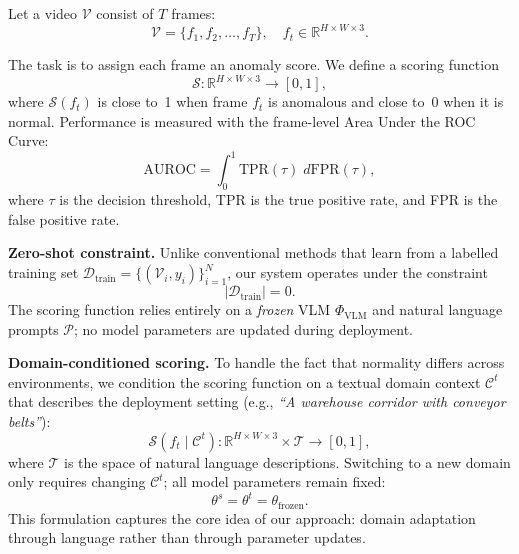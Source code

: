 Let a video $\mathcal{V}$ consist of $T$ frames:
\begin{equation}
    \mathcal{V} = \{f_1, f_2, \ldots, f_T\}, \quad f_t \in \mathbb{R}^{H \times W \times 3}.
\end{equation}

\noindent The task is to assign each frame an anomaly score. We define a scoring function
\begin{equation}
    \mathcal{S} : \mathbb{R}^{H \times W \times 3} \rightarrow [0, 1],
\end{equation}
where $\mathcal{S}(f_t)$ is close to~1 when frame $f_t$ is anomalous and close to~0 when it is normal. Performance is measured with the frame-level Area Under the ROC Curve:
\begin{equation}
    \text{AUROC} = \int_{0}^{1} \text{TPR}(\tau) \; d\text{FPR}(\tau),
\end{equation}
where $\tau$ is the decision threshold, TPR is the true positive rate, and FPR is the false positive rate.

\medskip
\noindent\textbf{Zero-shot constraint.} Unlike conventional methods that learn from a labelled training set $\mathcal{D}_{\text{train}} = \{(\mathcal{V}_i, y_i)\}_{i=1}^{N}$, our system operates under the constraint
\begin{equation}
    |\mathcal{D}_{\text{train}}| = 0.
\end{equation}
The scoring function relies entirely on a \textit{frozen} VLM $\Phi_{\text{VLM}}$ and natural language prompts $\mathcal{P}$; no model parameters are updated during deployment.

\medskip
\noindent\textbf{Domain-conditioned scoring.} To handle the fact that normality differs across environments, we condition the scoring function on a textual domain context $\mathcal{C}^{t}$ that describes the deployment setting (e.g., \textit{``A warehouse corridor with conveyor belts''}):
\begin{equation}
    \mathcal{S}(f_t \mid \mathcal{C}^{t}) : \mathbb{R}^{H \times W \times 3} \times \mathcal{T} \rightarrow [0, 1],
\end{equation}
where $\mathcal{T}$ is the space of natural language descriptions. Switching to a new domain only requires changing $\mathcal{C}^{t}$; all model parameters remain fixed:
\begin{equation}
    \theta^{s} = \theta^{t} = \theta_{\text{frozen}}.
\end{equation}
This formulation captures the core idea of our approach: domain adaptation through language rather than through parameter updates.

